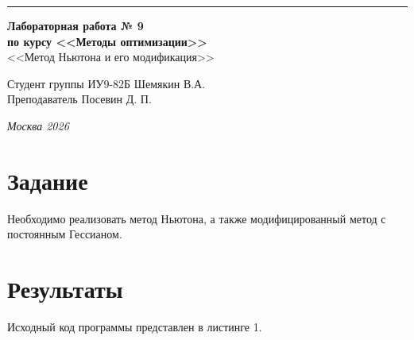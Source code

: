 \documentclass[a4paper, 14pt]{extarticle}
\begin{document}
\begin{titlepage}
\vspace*{-16pt}
\hspace{30pt}\rule{0.866\textwidth}{0.4pt}
  
\vspace{11em}

\begin{center}
\Large {\bf Лабораторная работа № 9} \\ 
\large {\bf по курсу <<Методы оптимизации>>} \\
\large <<Метод Ньютона и его модификация>> 
\end{center}\normalsize

\vspace{8em}


\begin{flushright}
  {Студент группы ИУ9-82Б Шемякин В.А. \hspace*{15pt}\\ 
  \vspace{2ex}
  Преподаватель Посевин Д. П.\hspace*{15pt}}
\end{flushright}

\bigskip

\vfill
 

\begin{center}
\textsl{Москва 2026}
\end{center}
\end{titlepage}

\renewcommand{\ttdefault}{pcr}

\setlength{\tabcolsep}{3pt}
\newpage
\setcounter{page}{2}

\section{Задание}\label{Sect::task}
Необходимо реализовать метод Ньютона, а также модифицированный метод с постоянным Гессианом.
\section{Результаты}\label{Sect::res}

Исходный код программы представлен в листинге 1.
\end{document}

